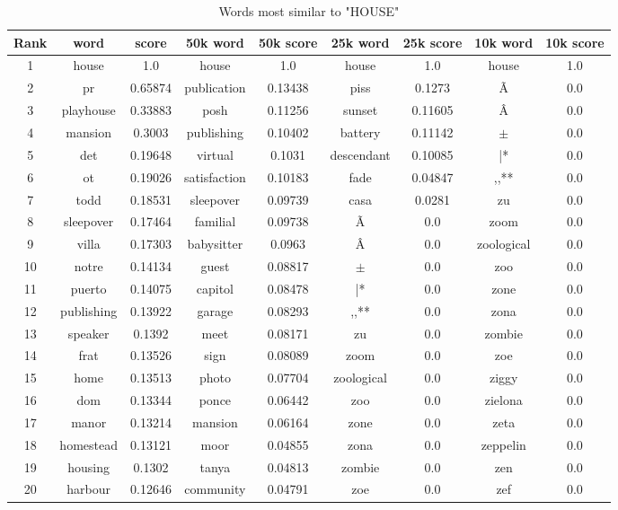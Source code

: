 \documentclass[10pt, a4paper, oneside]{article} %
\begin{document}
\pagebreak


\begin{table}[!h]
\centering
\begin{tabular}{ | c | c | c | | c | c || c | c || c | c |}
\hline
Rank & word & score  & 50k word & 50k score & 25k word & 25k score & 10k word & 10k score\\ \hline
1 & house & 1.0 &house & 1.0 &house & 1.0 &house & 1.0 \\
2 & pr & 0.65874 &publication & 0.13438 &piss & 0.1273 &Ã & 0.0 \\
3 & playhouse & 0.33883 &posh & 0.11256 &sunset & 0.11605 &Â & 0.0 \\
4 & mansion & 0.3003 &publishing & 0.10402 &battery & 0.11142 &$\pm$ & 0.0 \\
5 & det & 0.19648 &virtual & 0.1031 &descendant & 0.10085 &|* & 0.0 \\
6 & ot & 0.19026 &satisfaction & 0.10183 &fade & 0.04847 &,,** & 0.0 \\
7 & todd & 0.18531 &sleepover & 0.09739 &casa & 0.0281 &zu & 0.0 \\
8 & sleepover & 0.17464 &familial & 0.09738 &Ã & 0.0 &zoom & 0.0 \\
9 & villa & 0.17303 &babysitter & 0.0963 &Â & 0.0 &zoological & 0.0 \\
10 & notre & 0.14134 &guest & 0.08817 &$\pm$ & 0.0 &zoo & 0.0 \\
11 & puerto & 0.14075 &capitol & 0.08478 &|* & 0.0 &zone & 0.0 \\
12 & publishing & 0.13922 &garage & 0.08293 &,,** & 0.0 &zona & 0.0 \\
13 & speaker & 0.1392 &meet & 0.08171 &zu & 0.0 &zombie & 0.0 \\
14 & frat & 0.13526 &sign & 0.08089 &zoom & 0.0 &zoe & 0.0 \\
15 & home & 0.13513 &photo & 0.07704 &zoological & 0.0 &ziggy & 0.0 \\
16 & dom & 0.13344 &ponce & 0.06442 &zoo & 0.0 &zielona & 0.0 \\
17 & manor & 0.13214 &mansion & 0.06164 &zone & 0.0 &zeta & 0.0 \\
18 & homestead & 0.13121 &moor & 0.04855 &zona & 0.0 &zeppelin & 0.0 \\
19 & housing & 0.1302 &tanya & 0.04813 &zombie & 0.0 &zen & 0.0 \\
20 & harbour & 0.12646 &community & 0.04791 &zoe & 0.0&zef & 0.0 \\
 \hline
\end{tabular}
\caption{Words most similar to "HOUSE"}
\label{house}
\end{table}
\end{document}
